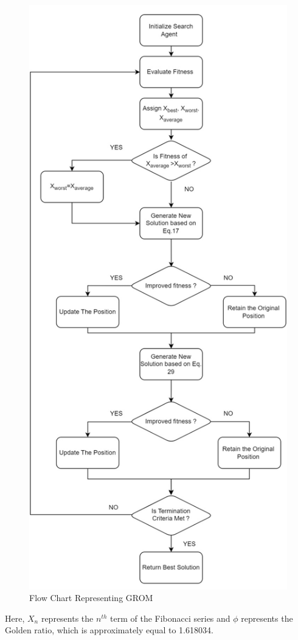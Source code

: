 \begin{figure}[htbp]
\centering
\includegraphics[width=0.8\linewidth]{images/39b6f92eefb2f0dca2f4a76b08d924bec286d02ffb9b0dc487b9b7920a88e5b7.jpg}
\caption{Flow Chart Representing GROM}
\label{fig:2}
\end{figure}


Here, $X_{n}$ represents the $n^{t h}$ term of the Fibonacci series and $\phi$ represents the Golden ratio, which is approximately equal to 1.618034.

